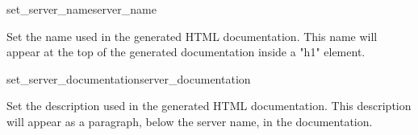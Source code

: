 \begin{methoddesc}{set_server_name}{server_name}

Set the name used in the generated HTML documentation. This name will
appear at the top of the generated documentation inside a "h1"
element.

\end{methoddesc}


\begin{methoddesc}{set_server_documentation}{server_documentation}

Set the description used in the generated HTML documentation. This
description will appear as a paragraph, below the server name, in the
documentation.

\end{methoddesc}
